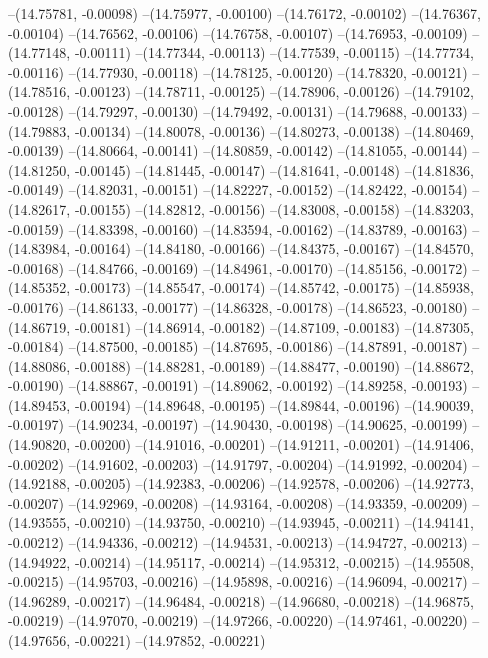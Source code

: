 --(14.75781, -0.00098)
--(14.75977, -0.00100)
--(14.76172, -0.00102)
--(14.76367, -0.00104)
--(14.76562, -0.00106)
--(14.76758, -0.00107)
--(14.76953, -0.00109)
--(14.77148, -0.00111)
--(14.77344, -0.00113)
--(14.77539, -0.00115)
--(14.77734, -0.00116)
--(14.77930, -0.00118)
--(14.78125, -0.00120)
--(14.78320, -0.00121)
--(14.78516, -0.00123)
--(14.78711, -0.00125)
--(14.78906, -0.00126)
--(14.79102, -0.00128)
--(14.79297, -0.00130)
--(14.79492, -0.00131)
--(14.79688, -0.00133)
--(14.79883, -0.00134)
--(14.80078, -0.00136)
--(14.80273, -0.00138)
--(14.80469, -0.00139)
--(14.80664, -0.00141)
--(14.80859, -0.00142)
--(14.81055, -0.00144)
--(14.81250, -0.00145)
--(14.81445, -0.00147)
--(14.81641, -0.00148)
--(14.81836, -0.00149)
--(14.82031, -0.00151)
--(14.82227, -0.00152)
--(14.82422, -0.00154)
--(14.82617, -0.00155)
--(14.82812, -0.00156)
--(14.83008, -0.00158)
--(14.83203, -0.00159)
--(14.83398, -0.00160)
--(14.83594, -0.00162)
--(14.83789, -0.00163)
--(14.83984, -0.00164)
--(14.84180, -0.00166)
--(14.84375, -0.00167)
--(14.84570, -0.00168)
--(14.84766, -0.00169)
--(14.84961, -0.00170)
--(14.85156, -0.00172)
--(14.85352, -0.00173)
--(14.85547, -0.00174)
--(14.85742, -0.00175)
--(14.85938, -0.00176)
--(14.86133, -0.00177)
--(14.86328, -0.00178)
--(14.86523, -0.00180)
--(14.86719, -0.00181)
--(14.86914, -0.00182)
--(14.87109, -0.00183)
--(14.87305, -0.00184)
--(14.87500, -0.00185)
--(14.87695, -0.00186)
--(14.87891, -0.00187)
--(14.88086, -0.00188)
--(14.88281, -0.00189)
--(14.88477, -0.00190)
--(14.88672, -0.00190)
--(14.88867, -0.00191)
--(14.89062, -0.00192)
--(14.89258, -0.00193)
--(14.89453, -0.00194)
--(14.89648, -0.00195)
--(14.89844, -0.00196)
--(14.90039, -0.00197)
--(14.90234, -0.00197)
--(14.90430, -0.00198)
--(14.90625, -0.00199)
--(14.90820, -0.00200)
--(14.91016, -0.00201)
--(14.91211, -0.00201)
--(14.91406, -0.00202)
--(14.91602, -0.00203)
--(14.91797, -0.00204)
--(14.91992, -0.00204)
--(14.92188, -0.00205)
--(14.92383, -0.00206)
--(14.92578, -0.00206)
--(14.92773, -0.00207)
--(14.92969, -0.00208)
--(14.93164, -0.00208)
--(14.93359, -0.00209)
--(14.93555, -0.00210)
--(14.93750, -0.00210)
--(14.93945, -0.00211)
--(14.94141, -0.00212)
--(14.94336, -0.00212)
--(14.94531, -0.00213)
--(14.94727, -0.00213)
--(14.94922, -0.00214)
--(14.95117, -0.00214)
--(14.95312, -0.00215)
--(14.95508, -0.00215)
--(14.95703, -0.00216)
--(14.95898, -0.00216)
--(14.96094, -0.00217)
--(14.96289, -0.00217)
--(14.96484, -0.00218)
--(14.96680, -0.00218)
--(14.96875, -0.00219)
--(14.97070, -0.00219)
--(14.97266, -0.00220)
--(14.97461, -0.00220)
--(14.97656, -0.00221)
--(14.97852, -0.00221)
